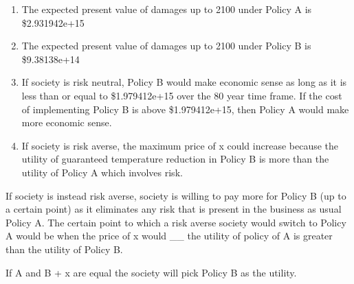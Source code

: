 \documentclass[
]{article}
\begin{document}
\begin{enumerate}
\def\labelenumi{\Alph{enumi})}
\item
  The expected present value of damages up to 2100 under Policy A is
  \$2.931942e+15
\item
  The expected present value of damages up to 2100 under Policy B is
  \$9.38138e+14
\item
  If society is risk neutral, Policy B would make economic sense as long
  as it is less than or equal to \$1.979412e+15 over the 80 year time
  frame. If the cost of implementing Policy B is above \$1.979412e+15,
  then Policy A would make more economic sense.
\item
  If society is risk averse, the maximum price of x could increase
  because the utility of guaranteed temperature reduction in Policy B is
  more than the utility of Policy A which involves risk.
\end{enumerate}

If society is instead risk averse, society is willing to pay more for
Policy B (up to a certain point) as it eliminates any risk that is
present in the business as usual Policy A. The certain point to which a
risk averse society would switch to Policy A would be when the price of
x would \_\_ the utility of policy of A is greater than the utility of
Policy B.

If A and B + x are equal the society will pick Policy B as the utility.
\end{document}
